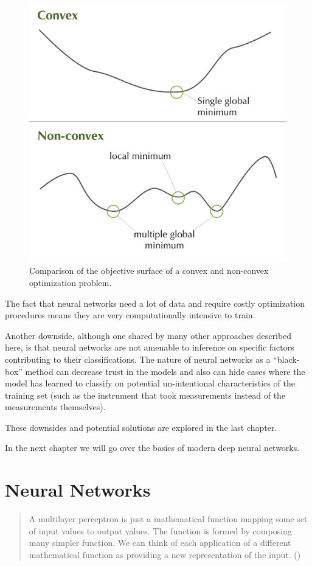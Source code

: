 \documentclass[]{book}
\theoremstyle{definition}
\theoremstyle{definition}
\theoremstyle{definition}
\theoremstyle{remark}
\begin{document}
\begin{figure}

{\centering \includegraphics[width=0.6\linewidth]{figures/convex_optimization} 

}

\caption{Comparison of the objective surface of a convex and non-convex optimization problem.}\label{fig:convexoptim}
\end{figure}

The fact that neural networks need a lot of data and require costly
optimization procedures means they are very computationally intensive to
train.

Another downside, although one shared by many other approaches described
here, is that neural networks are not amenable to inference on specific
factors contributing to their classifications. The nature of neural
networks as a ``black-box'' method can decrease trust in the models and
also can hide cases where the model has learned to classify on potential
un-intentional characteristics of the training set (such as the
instrument that took measurements instead of the measurements
themselves).

These downsides and potential solutions are explored in the last
chapter.

In the next chapter we will go over the basics of modern deep neural
networks.

\chapter{Neural Networks}\label{neuralnetworks}

\begin{quote}
A multilayer perceptron is just a mathematical function mapping some set
of input values to output values. The function is formed by composing
many simpler function. We can think of each application of a different
mathematical function as providing a new representation of the input.
(\citet{goodfellow_DL})
\end{quote}
\end{document}
